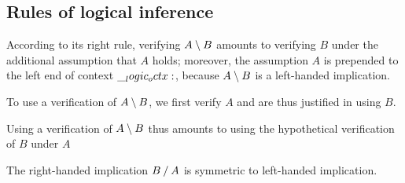 \subsection{Rules of logical inference}

According to its right rule, verifying $A \mathbin { \setminus } B$ amounts to verifying $B$ under the additional assumption that $A$ holds;
moreover, the assumption $A$ is prepended to the left end of context $\__logic_octx:$, because $A \mathbin { \setminus } B$ is a left-handed implication.

To use a verification of $A \mathbin { \setminus } B$, we first verify $A$ and are thus justified in using $B$.

Using a verification of $A \mathbin { \setminus } B$ thus amounts to using the hypothetical verification of $B$ under $A$


The right-handed implication $B \mathbin { / } A$ is symmetric to left-handed implication.


